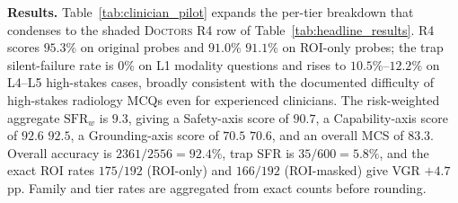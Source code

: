 \documentclass{article}
\providecommand{\DIFaddtex}[1]{{\protect\color{blue} \sf #1}} %
\providecommand{\DIFdeltex}[1]{{\protect\color{red} \scriptsize #1}} %
\providecommand{\DIFaddbegin}{} %
\providecommand{\DIFaddend}{} %
\providecommand{\DIFdelbegin}{} %
\providecommand{\DIFdelend}{} %
\providecommand{\DIFadd}[1]{\texorpdfstring{\DIFaddtex{#1}}{#1}} %
\providecommand{\DIFdel}[1]{\texorpdfstring{\DIFdeltex{#1}}{}} %
\begin{document}
\DIFaddend \textbf{Results.} Table~\ref{tab:clinician_pilot} expands the per-tier breakdown that condenses to the shaded \textsc{\DIFdelbegin \DIFdel{Doctors}\DIFdelend \DIFaddbegin \DIFadd{R4}\DIFaddend } row of Table~\ref{tab:headline_results}. \textsc{R4} scores $95.3\%$ on original probes and \DIFdelbegin \DIFdel{$91.0\%$ }\DIFdelend \DIFaddbegin \DIFadd{$91.1\%$ }\DIFaddend on ROI-only probes; the trap silent-failure rate is $0\%$ on L1 modality questions and rises to $10.5\%$--$12.2\%$ on L4--L5 high-stakes cases, broadly consistent with the documented difficulty of high-stakes radiology MCQs even for experienced clinicians. The risk-weighted aggregate $\mathrm{SFR}_w$ is $9.3$, giving a Safety-axis score of $90.7$, a Capability-axis score of \DIFdelbegin \DIFdel{$92.6$ }\DIFdelend \DIFaddbegin \DIFadd{$92.5$}\DIFaddend , a Grounding-axis score of \DIFdelbegin \DIFdel{$70.5$}\DIFdelend \DIFaddbegin \DIFadd{$70.6$}\DIFaddend , and an overall MCS of $83.3$. \DIFaddbegin \DIFadd{Overall accuracy is $2361/2556=92.4\%$, trap SFR is $35/600=5.8\%$, and the exact ROI rates $175/192$ (ROI-only) and $166/192$ (ROI-masked) give VGR $+4.7$\,pp. Family and tier rates are aggregated from exact counts before rounding.
}\DIFaddend 
\end{document}
